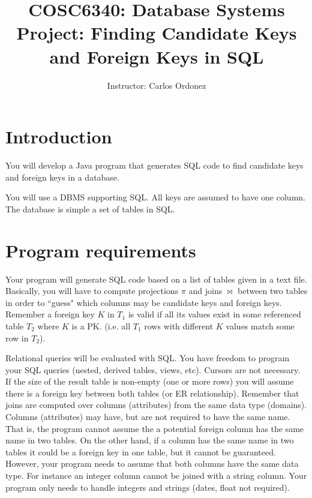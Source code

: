 
\title{COSC6340: Database Systems\\
Project: Finding Candidate Keys and Foreign Keys in SQL
}

\author{Instructor: Carlos Ordonez}
\date{}



\maketitle

\section{Introduction}
%
You will develop a Java program that generates SQL code to find candidate keys and
foreign keys in a database.  %

You will use a DBMS supporting SQL.
All keys are assumed to have one column.
The database is simple a set of tables in SQL.


\section{Program requirements}

Your program will generate SQL code based on a list of tables given in a text file. 
Basically, you will have to compute 
projections $\pi$ 
and 
joins $\Join$ between two tables 
in order to ``guess" which columns may be candidate keys and foreign keys.
Remember a foreign key $K$ in $T_1$ is valid 
if all its values exist in some referenced table $T_2$ where $K$ is a PK.
(i.e. all $T_1$ rows with different $K$ values match some row in $T_2$).


Relational queries will be evaluated with SQL. You have freedom to program your SQL queries
(nested, derived tables, views, etc). Cursors are not necessary.
%
If the size of the result table is non-empty (one or more rows) you will assume there
is a foreign key between both tables (or ER relationship).
Remember that joins are computed over columns (attributes) from the same data type (domains).
Columns (attributes) may have, but are not required to have the same name.
That is, the program cannot assume the a potential foreign column has the same name in two tables.
On the other hand, if a column has the same name in two tables it could
be a foreign key in one table, but it cannot be guaranteed.
However, your program needs to assume that both columns have the same data type.
For instance an integer column cannot be joined with a string column.
Your program only needs to handle integers and strings (dates, float not required).

